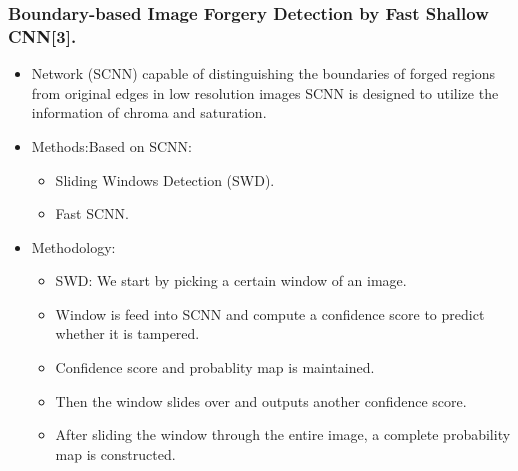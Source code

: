 \documentclass{beamer} %
\theoremstyle{definition} %
\begin{document}
\iffalse
\begin{frame}
\frametitle{Image Steganography with Modified LSB and AES Encryption standards}

	\begin{figure}
		\texttt{[image: modifiedLSB.png]}
		\caption{Image Steganography with Modified LSB and AES Encryption standards}
	\end{figure}
	\end{frame}
\fi
\begin{frame}

\frametitle{Boundary-based Image Forgery Detection by Fast Shallow CNN[3].  }
\begin{itemize}
	\item{ Network (SCNN) capable of distinguishing the boundaries of
		forged regions from original edges in low resolution images 
		SCNN is designed to utilize the information of chroma and
		saturation.}
	\item{Methods:Based on SCNN:}
	\begin{itemize}
		\item Sliding Windows Detection (SWD).
		\item Fast SCNN.
	\end{itemize}
	\item {Methodology:}
	\begin{itemize}
		\item{SWD: We start by picking a certain window of an image.}
		\item Window is feed into SCNN and compute a confidence score to predict whether it is tampered. 
		\item Confidence score and probablity map is maintained.   
		\item Then the window slides over and outputs another confidence score. 
		\item After sliding the window through the entire image, a complete probability map is constructed.
    \end{itemize}
\end{itemize}
\end{frame}
\end{document}
